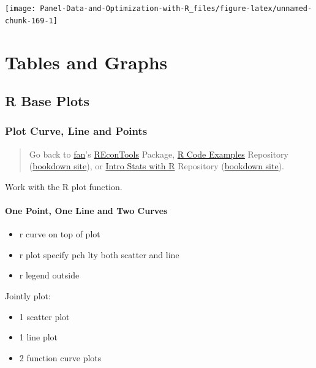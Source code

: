 \documentclass[
]{book}
\providecommand{\tightlist}{%
  \setlength{\itemsep}{0pt}\setlength{\parskip}{0pt}}
\begin{document}
\begin{center}\texttt{[image: Panel-Data-and-Optimization-with-R\_files/figure-latex/unnamed-chunk-169-1]} \end{center}

\hypertarget{tables-and-graphs}{%
\chapter{Tables and Graphs}\label{tables-and-graphs}}

\hypertarget{r-base-plots}{%
\section{R Base Plots}\label{r-base-plots}}

\hypertarget{plot-curve-line-and-points}{%
\subsection{Plot Curve, Line and Points}\label{plot-curve-line-and-points}}

\begin{quote}
Go back to \href{http://fanwangecon.github.io/}{fan}'s \href{https://fanwangecon.github.io/REconTools/}{REconTools} Package, \href{https://fanwangecon.github.io/R4Econ/}{R Code Examples} Repository (\href{https://fanwangecon.github.io/R4Econ/bookdown}{bookdown site}), or \href{https://fanwangecon.github.io/Stat4Econ/}{Intro Stats with R} Repository (\href{https://fanwangecon.github.io/Stat4Econ/bookdown}{bookdown site}).
\end{quote}

Work with the R plot function.

\hypertarget{one-point-one-line-and-two-curves}{%
\subsubsection{One Point, One Line and Two Curves}\label{one-point-one-line-and-two-curves}}

\begin{itemize}
\tightlist
\item
  r curve on top of plot
\item
  r plot specify pch lty both scatter and line
\item
  r legend outside
\end{itemize}

Jointly plot:

\begin{itemize}
\tightlist
\item
  1 scatter plot
\item
  1 line plot
\item
  2 function curve plots
\end{itemize}
\end{document}
